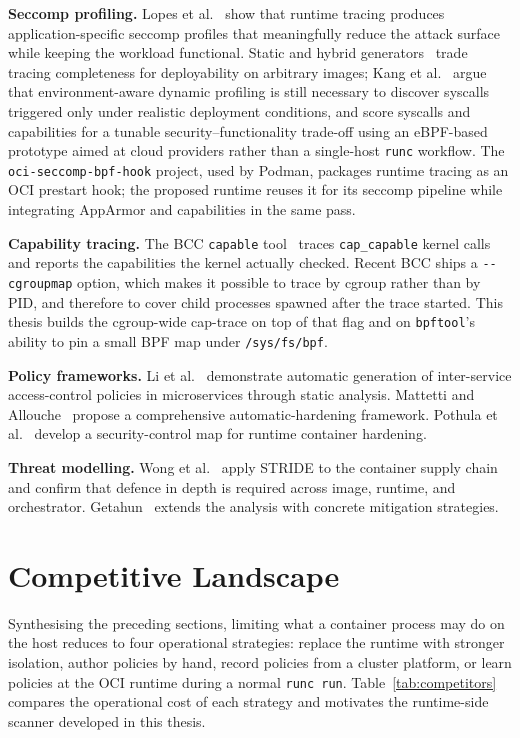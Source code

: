\textbf{Seccomp profiling.} Lopes et al.~\cite{lopes2020} show that runtime tracing produces application-specific seccomp profiles that meaningfully reduce the attack surface while keeping the workload functional. Static and hybrid generators~\cite{ghavamnia2020confine,demarinis2020sysfilter,canella2021,zhan2023sysverify} trade tracing completeness for deployability on arbitrary images; Kang et al.~\cite{kang2026beacon} argue that environment-aware dynamic profiling is still necessary to discover syscalls triggered only under realistic deployment conditions, and score syscalls and capabilities for a tunable security--functionality trade-off using an eBPF-based prototype aimed at cloud providers rather than a single-host \texttt{runc} workflow. The \texttt{oci-seccomp-bpf-hook} project, used by Podman, packages runtime tracing as an OCI prestart hook; the proposed runtime reuses it for its seccomp pipeline while integrating AppArmor and capabilities in the same pass.

\textbf{Capability tracing.} The BCC \texttt{capable} tool~\cite{bcc2025} traces \texttt{cap\_capable} kernel calls and reports the capabilities the kernel actually checked. Recent BCC ships a \texttt{-{}-cgroupmap} option, which makes it possible to trace by cgroup rather than by PID, and therefore to cover child processes spawned after the trace started. This thesis builds the cgroup-wide cap-trace on top of that flag and on \texttt{bpftool}'s ability to pin a small BPF map under \texttt{/sys/fs/bpf}.

\textbf{Policy frameworks.} Li et al.~\cite{li2021} demonstrate automatic generation of inter-service access-control policies in microservices through static analysis. Mattetti and Allouche~\cite{mattetti2020} propose a comprehensive automatic-hardening framework. Pothula et al.~\cite{pothula2019} develop a security-control map for runtime container hardening.

\textbf{Threat modelling.} Wong et al.~\cite{wong2023} apply STRIDE to the container supply chain and confirm that defence in depth is required across image, runtime, and orchestrator. Getahun~\cite{getahun2021} extends the analysis with concrete mitigation strategies.

\section{Competitive Landscape}\label{sec:competitive}

Synthesising the preceding sections, limiting what a container process may do on the host reduces to four operational strategies: replace the runtime with stronger isolation, author policies by hand, record policies from a cluster platform, or learn policies at the OCI runtime during a normal \texttt{runc run}. Table~\ref{tab:competitors} compares the operational cost of each strategy and motivates the runtime-side scanner developed in this thesis.

